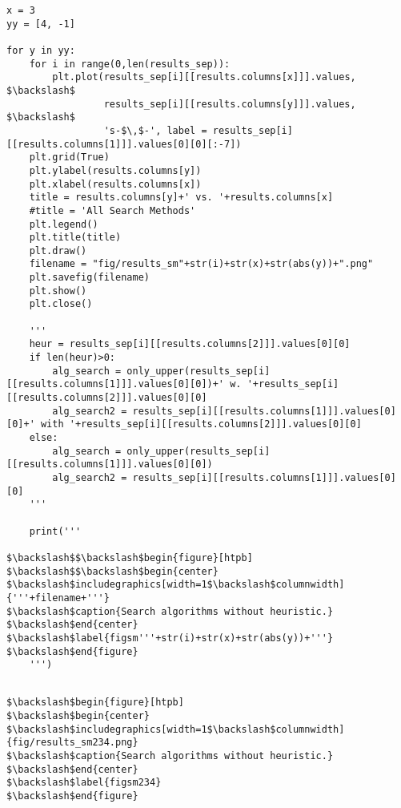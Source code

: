 \documentclass{article}
\begin{document}
    
\begin{verbatim}x = 3
yy = [4, -1]

for y in yy:
    for i in range(0,len(results_sep)):
        plt.plot(results_sep[i][[results.columns[x]]].values, $\backslash$
                 results_sep[i][[results.columns[y]]].values, $\backslash$
                 's-$\,$-', label = results_sep[i][[results.columns[1]]].values[0][0][:-7])
    plt.grid(True)
    plt.ylabel(results.columns[y])
    plt.xlabel(results.columns[x])
    title = results.columns[y]+' vs. '+results.columns[x]
    #title = 'All Search Methods'
    plt.legend()
    plt.title(title)
    plt.draw()
    filename = "fig/results_sm"+str(i)+str(x)+str(abs(y))+".png"
    plt.savefig(filename)
    plt.show()
    plt.close()

    '''
    heur = results_sep[i][[results.columns[2]]].values[0][0]
    if len(heur)>0:
        alg_search = only_upper(results_sep[i][[results.columns[1]]].values[0][0])+' w. '+results_sep[i][[results.columns[2]]].values[0][0]
        alg_search2 = results_sep[i][[results.columns[1]]].values[0][0]+' with '+results_sep[i][[results.columns[2]]].values[0][0]
    else:
        alg_search = only_upper(results_sep[i][[results.columns[1]]].values[0][0])
        alg_search2 = results_sep[i][[results.columns[1]]].values[0][0]
    '''

    print('''

$\backslash$$\backslash$begin{figure}[htpb]
$\backslash$$\backslash$begin{center}
$\backslash$includegraphics[width=1$\backslash$columnwidth]{'''+filename+'''}
$\backslash$caption{Search algorithms without heuristic.}
$\backslash$end{center}
$\backslash$label{figsm'''+str(i)+str(x)+str(abs(y))+'''}
$\backslash$end{figure}
    ''')
\end{verbatim}




























\begin{verbatim}

$\backslash$begin{figure}[htpb]
$\backslash$begin{center}
$\backslash$includegraphics[width=1$\backslash$columnwidth]{fig/results_sm234.png}
$\backslash$caption{Search algorithms without heuristic.}
$\backslash$end{center}
$\backslash$label{figsm234}
$\backslash$end{figure}
    
\end{verbatim}
\end{document}
